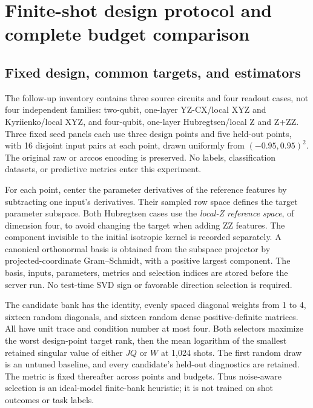 \section{Finite-shot design protocol and complete budget comparison}
\label{app:shotprotocol}
\subsection{Fixed design, common targets, and estimators}
The follow-up inventory contains three source circuits and four
readout cases, not four independent families: two-qubit, one-layer
YZ-CX/local XYZ and Kyriienko/local XYZ, and four-qubit, one-layer
Hubregtsen/local Z and Z+ZZ. Three fixed seed panels each use three
design points and five held-out points, with 16 disjoint input pairs
at each point, drawn uniformly from $(-0.95,0.95)^2$. The original
raw or arccos encoding is preserved. No labels, classification
datasets, or predictive metrics enter this experiment.

For each point, center the parameter derivatives of the reference
features by subtracting one input's derivatives. Their sampled row
space defines the target parameter subspace. Both Hubregtsen cases
use the \emph{local-Z reference space}, of dimension four, to avoid
changing the target when adding ZZ features. The component invisible
to the initial isotropic kernel is recorded separately. A canonical
orthonormal basis is obtained from the subspace projector by
projected-coordinate Gram--Schmidt, with a positive largest component.
The basis, inputs, parameters, metrics and selection indices are
stored before the server run. No test-time SVD sign or favorable
direction selection is required.

The candidate bank has the identity, evenly spaced diagonal weights
from 1 to 4, sixteen random diagonals, and sixteen random dense
positive-definite matrices. All have unit trace and condition number
at most four. Both selectors maximize the worst design-point target
rank, then the mean logarithm of the smallest retained singular value
of either $JQ$ or $W$ at 1,024 shots. The first random draw is an
untuned baseline, and every candidate's held-out diagnostics are
retained. The metric is fixed thereafter across points and budgets.
Thus noise-aware selection is an ideal-model finite-bank heuristic;
it is not trained on shot outcomes or task labels.

